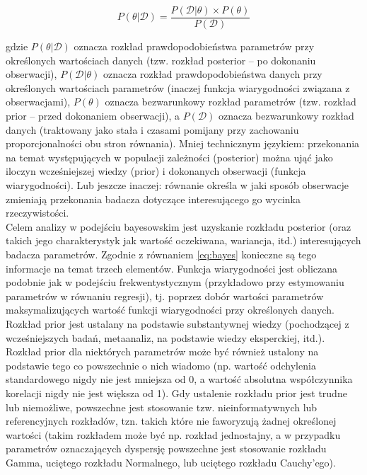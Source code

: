 \documentclass[man]{apa6}
\begin{document}
\begin{equation}\label{eq:bayes}
    P(\theta | \mathcal{D}) =
    \frac{P(\mathcal{D} | \theta)\times P(\theta)}
    {P(\mathcal{D})}
\end{equation}

gdzie $P(\theta | \mathcal{D})$ oznacza rozkład prawdopodobieństwa parametrów przy określonych wartościach danych (tzw. rozkład posterior -- po dokonaniu obserwacji), $P(\mathcal{D} | \theta)$ oznacza rozkład prawdopodobieństwa danych przy określonych wartościach parametrów (inaczej funkcja wiarygodności związana z obserwacjami), $P(\theta)$ oznacza bezwarunkowy rozkład parametrów (tzw. rozkład prior -- przed dokonaniem obserwacji), a $P(\mathcal{D})$ oznacza bezwarunkowy rozkład danych (traktowany jako stała i czasami pomijany przy zachowaniu proporcjonalności obu stron równania). Mniej technicznym językiem: przekonania na temat występujących w populacji zależności (posterior) można ująć jako iloczyn wcześniejszej wiedzy (prior) i dokonanych obserwacji (funkcja wiarygodności). Lub jeszcze inaczej: równanie określa w jaki sposób obserwacje zmieniają przekonania badacza dotyczące interesującego go
wycinka rzeczywistości. \\

Celem analizy w podejściu bayesowskim jest uzyskanie rozkładu posterior (oraz takich jego charakterystyk jak wartość oczekiwana, wariancja, itd.) interesujących badacza parametrów. Zgodnie z równaniem \ref{eq:bayes} konieczne są tego informacje na temat trzech elementów. Funkcja wiarygodności jest obliczana podobnie jak w podejściu frekwentystycznym (przykładowo przy estymowaniu parametrów w równaniu regresji), tj. poprzez dobór wartości parametrów maksymalizujących wartość funkcji wiarygodności przy określonych danych. Rozkład prior jest ustalany na podstawie substantywnej wiedzy (pochodzącej z wcześniejszych badań, metaanaliz, na podstawie wiedzy eksperckiej, itd.). Rozkład prior dla niektórych parametrów może być również ustalony na podstawie tego co powszechnie o nich wiadomo (np. wartość odchylenia standardowego nigdy nie jest mniejsza od 0, a wartość absolutna współczynnika korelacji nigdy nie jest większa od 1). Gdy ustalenie rozkładu prior jest trudne lub niemożliwe, powszechne jest stosowanie tzw. nieinformatywnych lub referencyjnych rozkładów, tzn. takich które nie faworyzują żadnej określonej wartości (takim rozkładem może być np. rozkład jednostajny, a w przypadku parametrów oznaczających dyspersję powszechne jest stosowanie rozkładu Gamma, uciętego rozkładu Normalnego, lub uciętego rozkładu Cauchy'ego).\\
\end{document}
